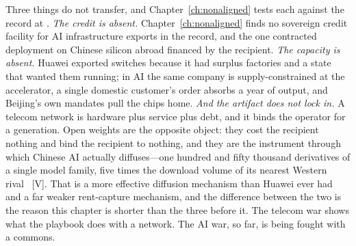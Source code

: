 Three things do not transfer, and Chapter~\ref{ch:nonaligned} tests each against the record at \datafreeze. \emph{The credit is absent.} Chapter~\ref{ch:nonaligned} finds no sovereign credit facility for AI infrastructure exports in the record, and the one contracted deployment on Chinese silicon abroad financed by the recipient. \emph{The capacity is absent.} Huawei exported switches because it had surplus factories and a state that wanted them running; in AI the same company is supply-constrained at the accelerator, a single domestic customer's order absorbs a year of output, and Beijing's own mandates pull the chips home. \emph{And the artifact does not lock in.} A telecom network is hardware plus service plus debt, and it binds the operator for a generation. Open weights are the opposite object: they cost the recipient nothing and bind the recipient to nothing, and they are the instrument through which Chinese AI actually diffuses---one hundred and fifty thousand derivatives of a single model family, five times the download volume of its nearest Western rival~\cite{qwen-derivatives} [V]. That is a more effective diffusion mechanism than Huawei ever had and a far weaker rent-capture mechanism, and the difference between the two is the reason this chapter is shorter than the three before it. The telecom war shows what the playbook does with a network. The AI war, so far, is being fought with a commons.
